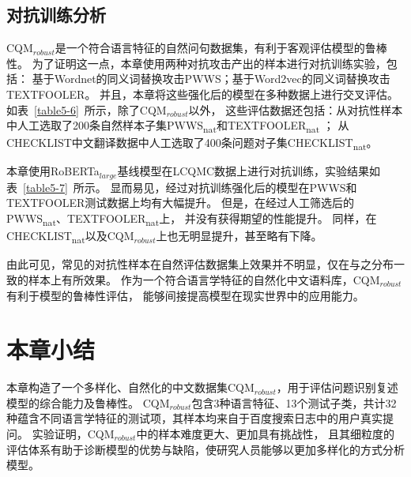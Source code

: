\subsection{对抗训练分析}

CQM$_{robust}$是一个符合语言特征的自然问句数据集，有利于客观评估模型的鲁棒性。
为了证明这一点，本章使用两种对抗攻击产出的样本进行对抗训练实验，包括：
基于Wordnet的同义词替换攻击PWWS\cite{ren2019generating}；基于Word2vec的同义词替换攻击TEXTFOOLER\cite{jin2020bert}。
并且，本章将这些强化后的模型在多种数据上进行交叉评估。
如表~\ref{table5-6}~所示，除了CQM$_{robust}$以外，
这些评估数据还包括：从对抗性样本中人工选取了200条自然样本子集PWWS\textsubscript{nat}和TEXTFOOLER\textsubscript{nat} ；
从CHECKLIST中文翻译数据中人工选取了400条问题对子集CHECKLIST\textsubscript{nat}。



本章使用RoBERTa$_{large}$基线模型在LCQMC数据上进行对抗训练，实验结果如表~\ref{table5-7}~所示。
显而易见，经过对抗训练强化后的模型在PWWS和TEXTFOOLER测试数据上均有大幅提升。
但是，在经过人工筛选后的PWWS\textsubscript{nat}、TEXTFOOLER\textsubscript{nat}上，
并没有获得期望的性能提升。
同样，在CHECKLIST\textsubscript{nat}以及CQM$_{robust}$上也无明显提升，甚至略有下降。



由此可见，常见的对抗性样本在自然评估数据集上效果并不明显，仅在与之分布一致的样本上有所效果。
作为一个符合语言学特征的自然化中文语料库，CQM$_{robust}$有利于模型的鲁棒性评估，
能够间接提高模型在现实世界中的应用能力。

\section{本章小结}

本章构造了一个多样化、自然化的中文数据集CQM$_{robust}$，用于评估问题识别复述模型的综合能力及鲁棒性。
CQM$_{robust}$包含3种语言特征、13个测试子类，共计32种蕴含不同语言学特征的测试项，其样本均来自于百度搜索日志中的用户真实提问。
实验证明，CQM$_{robust}$中的样本难度更大、更加具有挑战性，
且其细粒度的评估体系有助于诊断模型的优势与缺陷，使研究人员能够以更加多样化的方式分析模型。
